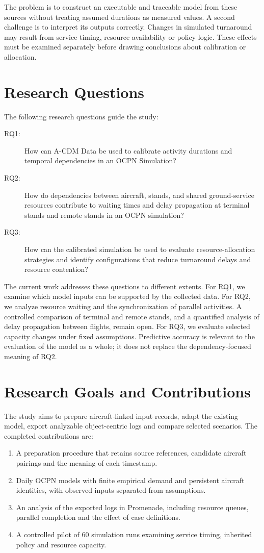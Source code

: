 The problem is to construct an executable and traceable model from these sources without treating assumed durations as measured values. A second challenge is to interpret its outputs correctly. Changes in simulated turnaround may result from service timing, resource availability or policy logic. These effects must be examined separately before drawing conclusions about calibration or allocation.

\section{Research Questions}
The following research questions guide the study:
\begin{description}
\item[RQ1:] How can A-CDM Data be used to calibrate activity durations and temporal dependencies in an OCPN Simulation?
\item[RQ2:] How do dependencies between aircraft, stands, and shared ground-service resources contribute to waiting times and delay propagation at terminal stands and remote stands in an OCPN simulation?
\item[RQ3:] How can the calibrated simulation be used to evaluate resource-allocation strategies and identify configurations that reduce turnaround delays and resource contention?
\end{description}

The current work addresses these questions to different extents. For RQ1, we examine which model inputs can be supported by the collected data. For RQ2, we analyze resource waiting and the synchronization of parallel activities. A controlled comparison of terminal and remote stands, and a quantified analysis of delay propagation between flights, remain open. For RQ3, we evaluate selected capacity changes under fixed assumptions. Predictive accuracy is relevant to the evaluation of the model as a whole; it does not replace the dependency-focused meaning of RQ2.

\section{Research Goals and Contributions}
The study aims to prepare aircraft-linked input records, adapt the existing model, export analyzable object-centric logs and compare selected scenarios. The completed contributions are:
\begin{enumerate}
\item A preparation procedure that retains source references, candidate aircraft pairings and the meaning of each timestamp.
\item Daily OCPN models with finite empirical demand and persistent aircraft identities, with observed inputs separated from assumptions.
\item An analysis of the exported logs in Promenade, including resource queues, parallel completion and the effect of case definitions.
\item A controlled pilot of 60 simulation runs examining service timing, inherited policy and resource capacity.
\end{enumerate}

